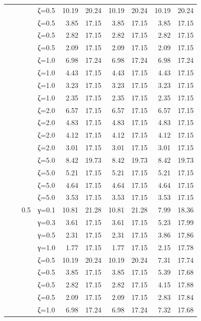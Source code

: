 \begin{table}[htbp]
\begin{tabular}{ll r l  rr  rr  rr}
  &  &  & ζ=0.5 & 10.19 & 20.24 & 10.19 & 20.24 & 10.19 & 20.24 \\
  &  &  & ζ=0.5 & 3.85 & 17.15 & 3.85 & 17.15 & 3.85 & 17.15 \\
  &  &  & ζ=0.5 & 2.82 & 17.15 & 2.82 & 17.15 & 2.82 & 17.15 \\
  &  &  & ζ=0.5 & 2.09 & 17.15 & 2.09 & 17.15 & 2.09 & 17.15 \\
  &  &  & ζ=1.0 & 6.98 & 17.24 & 6.98 & 17.24 & 6.98 & 17.24 \\
  &  &  & ζ=1.0 & 4.43 & 17.15 & 4.43 & 17.15 & 4.43 & 17.15 \\
  &  &  & ζ=1.0 & 3.23 & 17.15 & 3.23 & 17.15 & 3.23 & 17.15 \\
  &  &  & ζ=1.0 & 2.35 & 17.15 & 2.35 & 17.15 & 2.35 & 17.15 \\
  &  &  & ζ=2.0 & 6.57 & 17.15 & 6.57 & 17.15 & 6.57 & 17.15 \\
  &  &  & ζ=2.0 & 4.83 & 17.15 & 4.83 & 17.15 & 4.83 & 17.15 \\
  &  &  & ζ=2.0 & 4.12 & 17.15 & 4.12 & 17.15 & 4.12 & 17.15 \\
  &  &  & ζ=2.0 & 3.01 & 17.15 & 3.01 & 17.15 & 3.01 & 17.15 \\
  &  &  & ζ=5.0 & 8.42 & 19.73 & 8.42 & 19.73 & 8.42 & 19.73 \\
  &  &  & ζ=5.0 & 5.21 & 17.15 & 5.21 & 17.15 & 5.21 & 17.15 \\
  &  &  & ζ=5.0 & 4.64 & 17.15 & 4.64 & 17.15 & 4.64 & 17.15 \\
  &  &  & ζ=5.0 & 3.53 & 17.15 & 3.53 & 17.15 & 3.53 & 17.15 \\
  &  & 0.5 & γ=0.1 & 10.81 & 21.28 & 10.81 & 21.28 & 7.99 & 18.36 \\
  &  &  & γ=0.3 & 3.61 & 17.15 & 3.61 & 17.15 & 5.23 & 17.99 \\
  &  &  & γ=0.5 & 2.31 & 17.15 & 2.31 & 17.15 & 3.86 & 17.86 \\
  &  &  & γ=1.0 & 1.77 & 17.15 & 1.77 & 17.15 & 2.15 & 17.78 \\
  &  &  & ζ=0.5 & 10.19 & 20.24 & 10.19 & 20.24 & 7.31 & 17.74 \\
  &  &  & ζ=0.5 & 3.85 & 17.15 & 3.85 & 17.15 & 5.39 & 17.68 \\
  &  &  & ζ=0.5 & 2.82 & 17.15 & 2.82 & 17.15 & 4.15 & 17.88 \\
  &  &  & ζ=0.5 & 2.09 & 17.15 & 2.09 & 17.15 & 2.83 & 17.84 \\
  &  &  & ζ=1.0 & 6.98 & 17.24 & 6.98 & 17.24 & 7.32 & 17.68 \\

\end{tabular}
\end{table}
